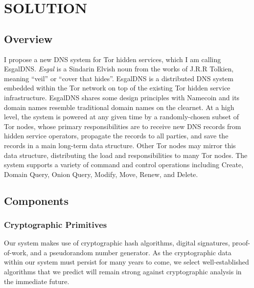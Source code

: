 
\chapter{SOLUTION}

\section{Overview}

I propose a new DNS system for Tor hidden services, which I am calling EsgalDNS. \emph{Esgal} is a Sindarin Elvish noun from the works of J.R.R Tolkien, meaning ``veil'' or ``cover that hides''.\cite{SindarinDict} EsgalDNS is a distributed DNS system embedded within the Tor network on top of the existing Tor hidden service infrastructure. EsgalDNS shares some design principles with Namecoin and its domain names resemble traditional domain names on the clearnet. At a high level, the system is powered at any given time by a randomly-chosen subset of Tor nodes, whose primary responsibilities are to receive new DNS records from hidden service operators, propagate the records to all parties, and save the records in a main long-term data structure. Other Tor nodes may mirror this data structure, distributing the load and responsibilities to many Tor nodes. The system supports a variety of command and control operations including Create, Domain Query, Onion Query, Modify, Move, Renew, and Delete.

\section{Components}

\subsection{Cryptographic Primitives}

Our system makes use of cryptographic hash algorithms, digital signatures, proof-of-work, and a pseudorandom number generator. As the cryptographic data within our system must persist for many years to come, we select well-established algorithms that we predict will remain strong against cryptographic analysis in the immediate future.

